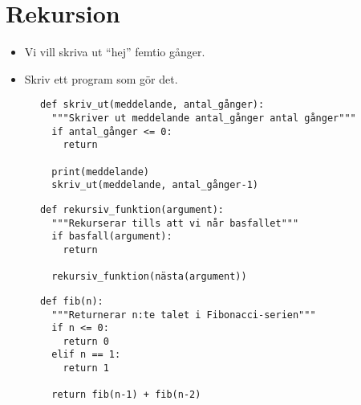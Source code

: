 \mode*

\section{Rekursion}

\begin{frame}
  \begin{exercise}
    \begin{itemize}
      \item Vi vill skriva ut \enquote{hej} femtio gånger.
      \item Skriv ett program som gör det.
    \end{itemize}
  \end{exercise}
\end{frame}

\begin{frame}[fragile]
  \begin{solution}
    \begin{verbatim}
      def skriv_ut(meddelande, antal_gånger):
        """Skriver ut meddelande antal_gånger antal gånger"""
        if antal_gånger <= 0:
          return

        print(meddelande)
        skriv_ut(meddelande, antal_gånger-1)
    \end{verbatim}
  \end{solution}
\end{frame}

\begin{frame}[fragile]
  \begin{definition}[Rekursion]
    \begin{verbatim}
      def rekursiv_funktion(argument):
        """Rekurserar tills att vi når basfallet"""
        if basfall(argument):
          return

        rekursiv_funktion(nästa(argument))
    \end{verbatim}
  \end{definition}
\end{frame}

\begin{frame}[fragile]
  \begin{example}[Fibonacci]
    \begin{verbatim}
      def fib(n):
        """Returnerar n:te talet i Fibonacci-serien"""
        if n <= 0:
          return 0
        elif n == 1:
          return 1

        return fib(n-1) + fib(n-2)
    \end{verbatim}
  \end{example}
\end{frame}

